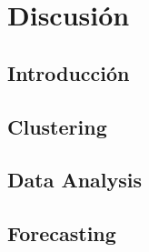 
\chapter{Discusión} %
\label{chap:discussion} %


\section{Introducción}








\section{Clustering}












\section{Data Analysis}













\section{Forecasting}





















